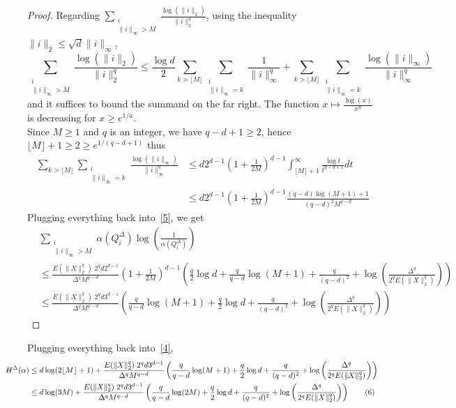 \documentclass[12pt]{report}
\theoremstyle{definition}
\theoremstyle{remark}
\begin{document}
\begin{proof}
Regarding $\displaystyle \sum \limits_{\substack{i\\ \|i\|_\infty > M}} \frac{\log(\|i\|_2)}{\|i\|_2^q}$, using the inequality $\|i\|_2\leq \sqrt d \|i\|_\infty$,
$$\sum \limits_{\substack{i\\ \|i\|_\infty > M}} \frac{\log(\|i\|_2)}{\|i\|_2^q} 
\leq \frac {\log d}{2}  \sum \limits_{ k > \lfloor M \rfloor} \sum \limits_{\substack{i\\ \|i\|_\infty =k}} \frac{1}{\|i\|_\infty^q}  + \sum \limits_{ k > \lfloor M \rfloor} \sum \limits_{\substack{i\\ \|i\|_\infty = k}} \frac{\log(\|i\|_\infty)}{\|i\|_\infty^q}$$ and it suffices to bound the summand on the far right. The function $x\mapsto \frac{\log(x)}{x^a}$ is decreasing for $x\geq e^{1/a}$.\\
Since $M\geq 1$ and $q$ is an integer, we have $q-d+1\geq 2$, hence $\lfloor M \rfloor+1 \geq 2 \geq e^{1/(q-d+1)}$ thus 
$$\begin{aligned}\sum \limits_{ k > \lfloor M \rfloor} \sum \limits_{\substack{i\\ \|i\|_\infty = k}} \frac{\log(\|i\|_\infty)}{\|i\|_\infty^q}
&\leq d 2^{d-1} \left(1+\frac{1}{2M} \right)^{d-1} \int_{ \lfloor M \rfloor+1}^\infty \frac{\log t}{t^{q-d+1}} dt\\
&\leq d 2^{d-1} \left(1+\frac{1}{2M} \right)^{d-1}  \frac{(q-d)\log(M+1)+1}{(q-d)^2 M^{q-d}}
\end{aligned}
$$
Plugging everything back into~\eqref{5}, we get 
\begin{align*}
&\sum_{\substack{i\\ \|i\|_\infty > M}} \alpha(Q_i^\Delta)\log\left(\frac{1}{\alpha(Q_i^\Delta)}\right)\\
&\leq
\frac{E(\|X\|_2^q)\; 2^q d 2^{d-1}}{\Delta^qM^{q-d}} \left(1+\frac{1}{2M} \right)^{d-1}
\left(
\frac{q}{2} \log d  + \frac{q}{q-d} \log(M+1) + \frac{q}{(q-d)^2} + \log\left(\frac{\Delta^q}{2^q E(\|X\|_2^q)} \right)
\right)  \\
&\leq 
\frac{E(\|X\|_2^q)\; 2^q d 3^{d-1}}{\Delta^qM^{q-d}}
\left(
\frac{q}{q-d} \log(M+1) + \frac{q}{2} \log d + \frac{q}{(q-d)^2} + \log\left(\frac{\Delta^q}{2^q E(\|X\|_2^q)} \right)
\right) 
\end{align*}
\end{proof}

Plugging everything back into~\eqref{4},
\begin{align*}\hspace{-1cm} H^{\Delta}(\alpha)&\leq 
d\log(2\lfloor M \rfloor + 1) + 
\frac{E(\|X\|_2^q)\; 2^q d 3^{d-1}}{\Delta^qM^{q-d}}
\left(
\frac{q}{q-d} \log(M+1) + \frac{q}{2} \log d  + \frac{q}{(q-d)^2} + \log\left(\frac{\Delta^q}{2^q E(\|X\|_2^q)} \right)
\right)\\
&\leq d\log(3 M) + 
\frac{E(\|X\|_2^q)\; 2^q d 3^{d-1}}{\Delta^qM^{q-d}}
\left(
\frac{q}{q-d} \log(2M) + \frac{q}{2} \log d  + \frac{q}{(q-d)^2} + \log\left(\frac{\Delta^q}{2^q E(\|X\|_2^q)} \right)
\right) \tag{6} \label{6}
\end{align*}
\end{document}

